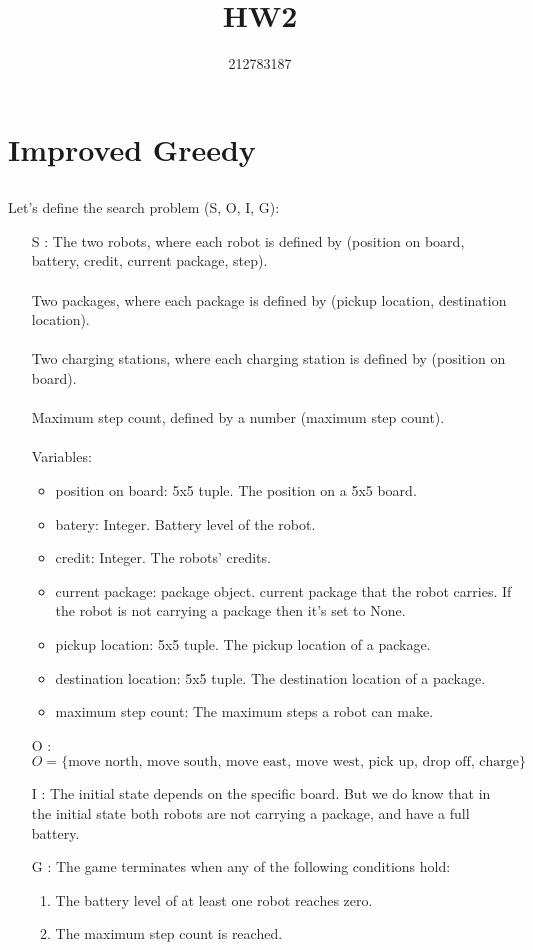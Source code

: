 \documentclass{article}
\title{HW2}
\author{212783187}
\begin{document}
\maketitle{}
\newpage
\section{Improved Greedy}
\subsection{}
Let's define the search problem (S, O, I, G):
\begin{itemize}
\item[S]: The two robots, where each robot is defined by (position on board, battery,  credit, current package, step).\\\\
Two packages, where each package is defined by (pickup location,  destination location).\\\\
Two charging stations, where each charging station is defined by (position on board).\\\\
Maximum step count, defined by a number (maximum step count).\\\\
Variables:
\begin{itemize}
\item position on board: 5x5 tuple. The position on a 5x5 board.
\item batery: Integer. Battery level of the robot.
\item credit: Integer. The robots' credits.
\item current package: package object. current package that the robot carries. If the robot is not carrying a package then it's set to None.
\item pickup location: 5x5 tuple. The pickup location of a package.
\item destination location: 5x5 tuple. The destination location of a package.
\item maximum step count: The maximum steps a robot can make.
\end{itemize}
\item[O]:
$$O = \{\text{move north, move south, move east, move west, pick up, drop off, charge}\}$$
\item[I]:
The initial state depends on the specific board. But we do know that in the initial state both robots are not carrying a package, and have a full battery.
\item[G]:
The game terminates when any of the following conditions hold:
\begin{enumerate}
\item The battery level of at least one robot reaches zero.
\item The maximum step count is reached.
\end{enumerate}
\end{itemize}
\end{document}
